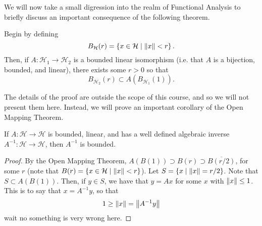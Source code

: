 We will now take a small digression into the realm of Functional Analysis to briefly discuss an
important consequence of the following theorem.
\begin{theorem}
    Begin by defining 
    \[
        B_{\mathcal{H}}(r) = \left\{ x \in \mathcal{H} \mid \left\| x \right\| < r \right\}.
    \]
    Then, if $A:
    \mathcal{H}_1 \to \mathcal{H}_2$ is a bounded linear isomorphism (i.e.  that $A$ is a bijection,
    bounded, and linear), there exists some $r > 0$ so that
    \[
        B_{\mathcal{H}_2}(r) \subset A(B_{\mathcal{H}_1}(1)).
    \]
\end{theorem}
The details of the proof are outside the scope of this course, and so we will not present them here.
Instead, we will prove an important corollary of the Open Mapping Theorem.
\begin{proposition}
    If $A: \mathcal{H} \to \mathcal{H}$ is bounded, linear, and has a well defined algebraic inverse
    $A^{-1}: \mathcal{H} \to \mathcal{H}$, then $A^{-1}$ is bounded.
\end{proposition}
\begin{proof}
    By the Open Mapping Theorem, $A(B(1)) \supset B(r) \supset \overline{B(r/2)}$, for some $r$ (note
    that $B(r) = \left\{ x \in \mathcal{H} \mid \left\| x \right\| < r \right\}$). Let $S = \left\{ x \mid \left\| x \right\| = r/2 \right\}$.
    Note that $S \subset A(B(1))$. Then, if $y \in S$, we have that $y = Ax$ for some $x$ with $\left\| x \right\|
    \leq 1$. This is to say that $x = A^{-1} y$, so that 
    \[
        1 \geq \left\| x \right\| = \left\| A^{-1} y \right\|
    \]
    wait no something is very wrong here.
\end{proof}
